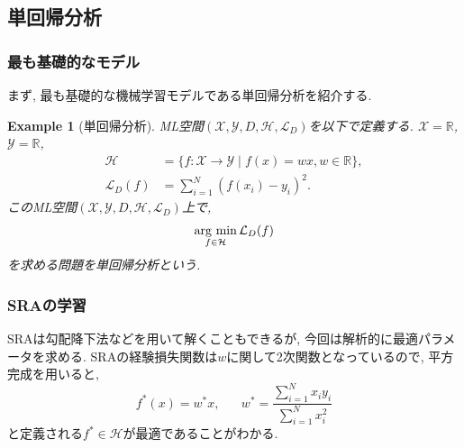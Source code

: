 \documentclass[dvipdfmx,11pt]{beamer}		%
\newtheorem{exam}[defi]{Example}
\newcommand{\R}{\mathbb{R}}
\newcommand{\X}{\mathcal{X}}
\newcommand{\Y}{\mathcal{Y}}
\newcommand{\Hil}{\mathcal{H}}
\newcommand{\Loss}{\mathcal{L}_{D}}
\newcommand{\MLsp}{(\X, \Y, D, \Hil, \Loss)}
\newcommand{\argmin}{\mathop{\rm arg~min}\limits}
\begin{document}
    \subsection{単回帰分析}
    \begin{frame}\frametitle{最も基礎的なモデル}
        まず, 最も基礎的な機械学習モデルである単回帰分析を紹介する. 
        \begin{exam}[単回帰分析]
            ML空間$\MLsp$を以下で定義する. $\X = \R$, $\Y = \R$, 
            \begin{align*}
                \Hil &= \{f:\X\to\Y\mid f(x) = wx, w\in\R\},\\
                \Loss(f) &= \sum_{i = 1}^{N}(f(x_i) - y_i)^2.
            \end{align*}
            このML空間$\MLsp$上で,
            \begin{align*}
                \argmin_{f\in\Hil}\Loss(f)
            \end{align*}
            を求める問題を単回帰分析という.
        \end{exam}
    \end{frame}
    \begin{frame}
        \frametitle{SRAの学習}
        SRAは勾配降下法などを用いて解くこともできるが, 今回は解析的に最適パラメータを求める. 
        SRAの経験損失関数は$w$に関して2次関数となっているので, 平方完成を用いると, 
        \begin{equation*}
            f^{*}(x) = w^{*}x, \hspace{20pt} w^* = \frac{\sum_{i = 1}^{N}x_{i}y_{i}}{\sum_{i = 1}^{N}x_{i}^2}
        \end{equation*}
        と定義される$f^*\in\Hil$が最適であることがわかる. 
    \end{frame}
\end{document}
